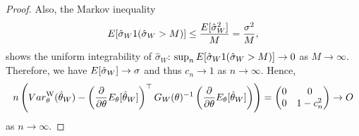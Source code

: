 \documentclass[10pt,a4paper]{amsart}
\begin{document}
\begin{proof}
	Also, the Markov inequality
	\begin{align*}
		{\rm E}[\hat{\sigma}_W 1 (\hat{\sigma}_W>M)] \leq \frac{{\rm E}[\hat{\sigma}_W^2]}{M}=\frac{\sigma^2}{M},
	\end{align*}
	shows the uniform integrability of $\hat{\sigma}_W$: $\sup_n {\rm E}[\hat{\sigma}_W 1 (\hat{\sigma}_W>M)] \to 0$ as $M \to \infty$.
	Therefore, we have ${\rm E}[\hat{\sigma}_W] \to \sigma$ and thus $c_n \to 1$ as $n \to \infty$.
	Hence,
	\begin{align*}
		n \left( {\rm Var}_{\theta}^{\mathrm{W}}(\hat{\theta}_W) -\left(\frac{\partial}{\partial \theta} {\rm E}_{\theta} [\hat{\theta}_W] \right)^\top G_W(\theta)^{-1} \left(\frac{\partial}{\partial \theta} {\rm E}_{\theta} [\hat{\theta}_W]\right) \right) = \begin{pmatrix}
			0 & 0 \\
			0 & 1-c_n^2
		\end{pmatrix} \to O
	\end{align*}
	as $n\to\infty$.
\end{proof}
\end{document}
